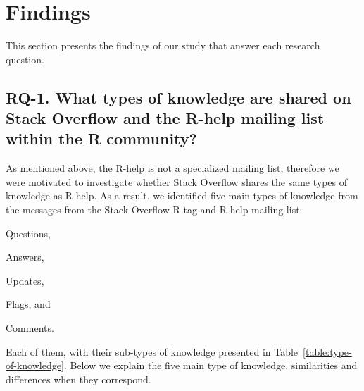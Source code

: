\section{Findings}
\label{cha:findings}

This section presents the findings of our study that answer each research question.

\subsection{RQ-1. What types of knowledge are shared on Stack Overflow and the R-help mailing list within the R community?}
\label{cha:findings-types}

	As mentioned above, the R-help is not a specialized mailing list, therefore we were motivated to investigate whether Stack Overflow shares the same types of knowledge as R-help.
	As a result, we identified five main types of knowledge from the messages from the Stack Overflow R tag and R-help mailing list:
	\begin{enumerate*}[label=(\arabic*)]
        \item Questions,
        \item Answers,
        \item Updates,
        \item Flags, and
        \item Comments.
	\end{enumerate*}
Each of them, with their sub-types of knowledge presented in Table~\ref{table:type-of-knowledge}.
Below we explain the five main type of knowledge, similarities and differences when they correspond.

